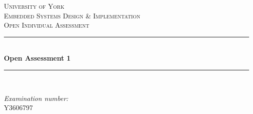 \documentclass[12pt]{article} %
\begin{document}

\begin{titlepage}

\newcommand{\HRule}{\rule{\linewidth}{0.5mm}} %

\center %

\textsc{\LARGE University of York}\\[1.5cm] %
\textsc{\Large Embedded Systems Design \& Implementation}\\[0.5cm] %
\textsc{\large Open Individual Assessment}\\[0.5cm] %

\HRule \\[0.4cm]
{ \huge \bfseries Open Assessment 1}\\[0.4cm] %
\HRule \\[1.5cm]

\begin{minipage}{0.4\textwidth}
\begin{flushleft} \large
\center \emph{Examination number:}\\
\center Y3606797
\end{flushleft}
\end{minipage}


\vfill %

\end{titlepage}


\tableofcontents %

\newpage %

\end{document}

